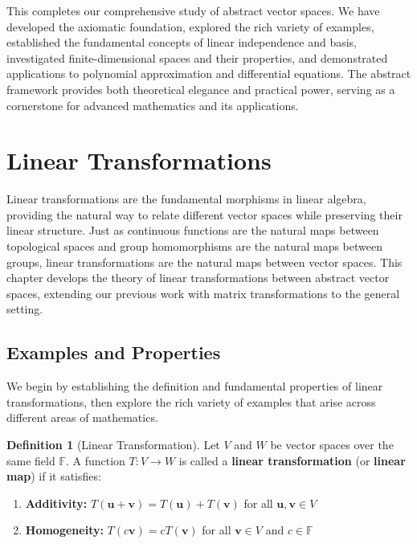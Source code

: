 \documentclass[12pt]{article}
\numberwithin{equation}{section}
\newcommand{\vect}[1]{\boldsymbol{#1}}   %
\theoremstyle{plain}
\theoremstyle{definition}
\newtheorem{definition}[theorem]{Definition}
\theoremstyle{remark}
\begin{document}
This completes our comprehensive study of abstract vector spaces. We have developed the axiomatic foundation, explored the rich variety of examples, established the fundamental concepts of linear independence and basis, investigated finite-dimensional spaces and their properties, and demonstrated applications to polynomial approximation and differential equations. The abstract framework provides both theoretical elegance and practical power, serving as a cornerstone for advanced mathematics and its applications.

\newpage
\section{Linear Transformations}

Linear transformations are the fundamental morphisms in linear algebra, providing the natural way to relate different vector spaces while preserving their linear structure. Just as continuous functions are the natural maps between topological spaces and group homomorphisms are the natural maps between groups, linear transformations are the natural maps between vector spaces. This chapter develops the theory of linear transformations between abstract vector spaces, extending our previous work with matrix transformations to the general setting.

\subsection{Examples and Properties}

We begin by establishing the definition and fundamental properties of linear transformations, then explore the rich variety of examples that arise across different areas of mathematics.

\begin{definition}[Linear Transformation]
Let $V$ and $W$ be vector spaces over the same field $\mathbb{F}$. A function $T: V \to W$ is called a \textbf{linear transformation} (or \textbf{linear map}) if it satisfies:
\begin{enumerate}
\item \textbf{Additivity:} $T(\vect{u} + \vect{v}) = T(\vect{u}) + T(\vect{v})$ for all $\vect{u}, \vect{v} \in V$
\item \textbf{Homogeneity:} $T(c\vect{v}) = cT(\vect{v})$ for all $\vect{v} \in V$ and $c \in \mathbb{F}$
\end{enumerate}
\end{definition}
\end{document}
